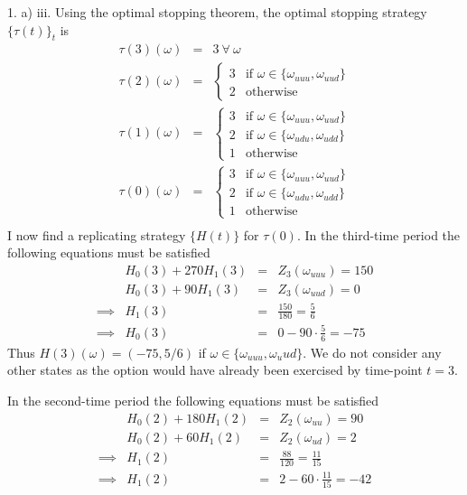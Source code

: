 \documentclass[11pt,a4paper]{article}
\begin{document}
\begin{answer}{1. a) iii.}
  Using the optimal stopping theorem, the optimal stopping strategy $\{\tau(t)\}_t$ is
  \[\begin{array}{rcl}
    \tau(3)(\omega)&=&3\ \forall\ \omega\\
    \tau(2)(\omega)&=&\begin{cases}
      3&\text{if }\omega\in\{\omega_{uuu},\omega_{uud}\}\\
      2&\text{otherwise}
    \end{cases}\\
    \tau(1)(\omega)&=&\begin{cases}
      3&\text{if }\omega\in\{\omega_{uuu},\omega_{uud}\}\\
      2&\text{if }\omega\in\{\omega_{udu},\omega_{udd}\}\\
      1&\text{otherwise}
    \end{cases}\\
    \tau(0)(\omega)&=&\begin{cases}
      3&\text{if }\omega\in\{\omega_{uuu},\omega_{uud}\}\\
      2&\text{if }\omega\in\{\omega_{udu},\omega_{udd}\}\\
      1&\text{otherwise}
    \end{cases}\\
  \end{array}\]
  I now find a replicating strategy $\{H(t)\}$ for $\tau(0)$. In the third-time period the following equations must be satisfied
  \[\begin{array}{rrcl}
    &H_0(3)+270H_1(3)&=&Z_3(\omega_{uuu})=150\\
    &H_0(3)+90H_1(3)&=&Z_3(\omega_{uud})=0\\
    \implies&H_1(3)&=&\frac{150}{180}=\frac56\\
    \implies&H_0(3)&=&0-90\cdot\frac56=-75
  \end{array}\]
  Thus $H(3)(\omega)=(-75,5/6)$ if $\omega\in\{\omega_{uuu},\omega_uud\}$. We do not consider any other states as the option would have already been exercised by time-point $t=3$.
  \par In the second-time period the following equations must be satisfied
  \[\begin{array}{rrcl}
    &H_0(2)+180H_1(2)&=&Z_2(\omega_{uu})=90\\
    &H_0(2)+60H_1(2)&=&Z_2(\omega_{ud})=2\\
    \implies&H_1(2)&=&\frac{88}{120}=\frac{11}{15}\\
    \implies&H_1(2)&=&2-60\cdot\frac{11}{15}=-42

\end{array}\]
\end{answer}
\end{document}
